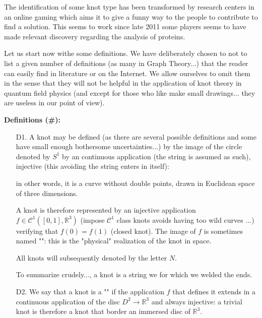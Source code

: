 {	\begin{tcolorbox}[title=Remark,colframe=black,arc=10pt]
	The identification of some knot type has been transformed by research centers in an online gaming which aims it to give a funny way to the people to contribute to find a solution. This seems to work since late 2011 some players seems to have made  relevant discovery regarding the analysis of proteins.
	\end{tcolorbox}
	
	Let us start now withe some definitions. We have deliberately chosen to not to list a given number of definitions (as many in Graph Theory...) that the reader can easily find in literature or on the Internet. We allow ourselves to omit them in the sense that they will not be helpful in the application of knot theory in quantum field physics (and except for those who like make small drawings... they are useless in our point of view).
	
	\textbf{Definitions (\#\mydef):}
	\begin{enumerate}
		\item[D1.] A knot may be defined (as there are several possible definitions and some have small enough bothersome uncertainties...) by the image of the circle denoted by $S^1$ by an continuous application (the string is assumed as such), injective (this avoiding the string enters in itself):
		
		in other words, it is a curve without double points, drawn in Euclidean space of three dimensions.

		A knot is therefore represented by an injective application $f\in \mathcal{C}^1 ([0,1],\mathbb{R}^3)$ (impose $\mathcal{C}^1$ class knots avoids having too wild curves ...) verifying that $f(0)=f(1)$ (closed knot). The image of $f$ is sometimes named "": this is the "physical" realization of the knot in space.
		\begin{tcolorbox}[title=Remark,colframe=black,arc=10pt]
		All knots will subsequently denoted by the letter $N$.
		\end{tcolorbox}
		
		To summarize crudely..., a knot is a string we for which we welded the ends.
		
		\item[D2.] We say that a knot is a "" if the application $f$ that defines it extends in a continuous application of the disc $D^2 \rightarrow \mathbb{R}^3$ and always injective: a trivial knot is therefore a knot that border an immersed disc of $\mathbb{R}^3$.
		

\end{enumerate}}
